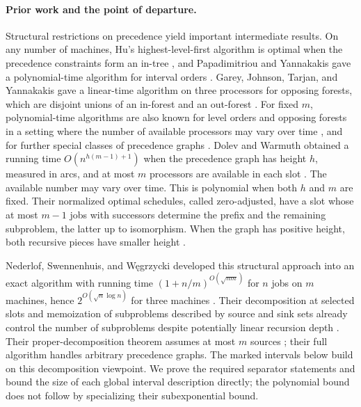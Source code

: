 \documentclass[11pt]{article}
\numberwithin{equation}{section}
\theoremstyle{definition}
\theoremstyle{remark}
\begin{document}
\paragraph{Prior work and the point of departure.}
Structural restrictions on precedence yield important intermediate
results. On any number of machines, Hu's highest-level-first algorithm
is optimal when the precedence constraints form an in-tree
\citep{Hu1961}, and Papadimitriou and Yannakakis gave a polynomial-time
algorithm for interval orders \citep{PapadimitriouYannakakis1979}.
Garey, Johnson, Tarjan, and Yannakakis gave a linear-time
algorithm on three processors for opposing forests, which are disjoint
unions of an in-forest and an out-forest
\citep[Section~4]{GareyJohnsonTarjanYannakakis1983}.
For fixed \(m\), polynomial-time algorithms are also known for level
orders and opposing forests in a setting where the number of available
processors may vary over time \citep{DolevWarmuth1985Profile}, and for
further special classes of precedence graphs \citep{DolevWarmuth1985Flat}.
Dolev and Warmuth obtained a running time
\(O(n^{h(m-1)+1})\) when the precedence graph has height \(h\), measured
in arcs, and at most \(m\) processors are available in each slot
\citep[Theorem~3]{DW1984}. The available number may vary over time.
This is polynomial when both \(h\) and \(m\) are fixed.
Their normalized optimal schedules, called zero-adjusted, have a slot
whose at most \(m-1\) jobs with successors determine the prefix and the
remaining subproblem, the latter up to isomorphism. When the graph has positive
height, both recursive pieces have smaller height
\citep[Theorem~2]{DW1984}.

Nederlof, Swennenhuis, and Węgrzycki developed this structural approach
into an exact algorithm with running
time \((1+n/m)^{O(\sqrt{nm})}\) for \(n\) jobs on \(m\) machines, hence
\(2^{O(\sqrt n\log n)}\) for three machines
\citep[Theorem~1.1]{NSW2025}.
Their decomposition at selected slots and memoization of subproblems
described by source and sink sets already control the number of
subproblems despite potentially linear recursion depth
\citep[Sections~5--6]{NSW2025}. Their proper-decomposition
theorem assumes at most \(m\) sources
\citep[Definition~1 and Theorem~3.1]{NSW2025}; their full algorithm
handles arbitrary precedence graphs. The marked intervals below build on
this decomposition viewpoint. We prove the required separator statements
and bound the size of each global interval description directly; the
polynomial bound does not follow by specializing their subexponential bound.
\end{document}
